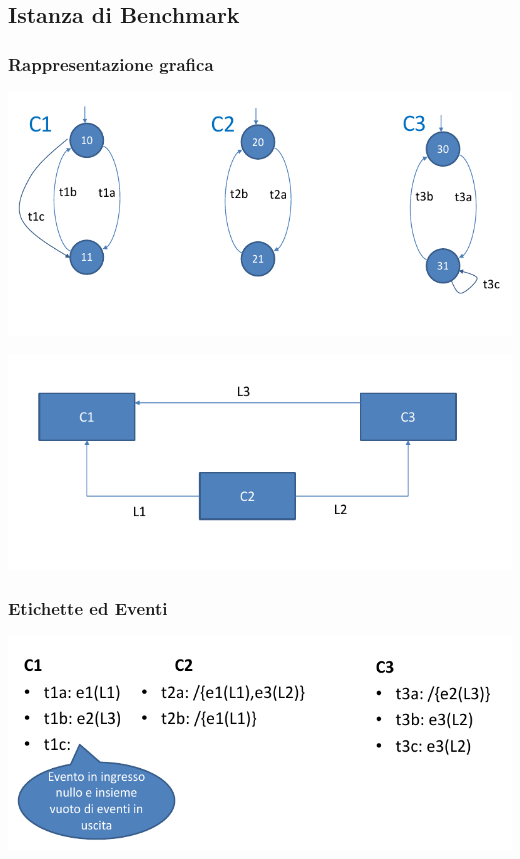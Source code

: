 \subsection{Istanza di Benchmark}
\subsubsection{Rappresentazione grafica}
\includegraphics[width=\textwidth]{immagini/c1.png}

\includegraphics[width=\textwidth]{immagini/c2.png}

\subsubsection{Etichette ed Eventi}

\includegraphics[width=\textwidth]{immagini/c3.png}

